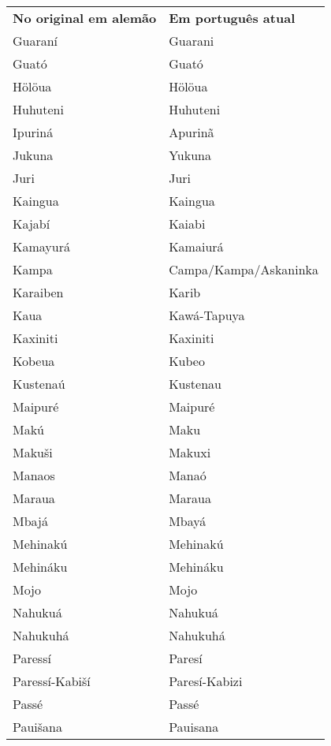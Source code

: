 \begin{table}[ht!]
\begin{center}
\begin{tabular}{ll}
\textbf{No original em alemão} & \textbf{Em português atual} \\
Guaraní & Guarani \\ 
Guató & Guató \\ 
Hölöua & Hölöua \\ 
Huhuteni & Huhuteni \\ 
Ipuriná & Apurinã \\ 
Jukuna & Yukuna \\ 
Juri & Juri \\ 
Kaingua & Kaingua \\ 
Kajabí & Kaiabi \\ 
Kamayurá & Kamaiurá \\ 
Kampa & Campa/Kampa/Askaninka \\ 
Karaiben & Karib \\ 
Kaua & Kawá-Tapuya \\ 
Kaxiniti & Kaxiniti \\ 
Kobeua & Kubeo \\ 
Kustenaú & Kustenau \\ 
Maipuré & Maipuré \\ 
Makú & Maku \\ 
Makuši & Makuxi \\ 
Manaos & Manaó \\ 
Maraua & Maraua \\ 
Mbajá & Mbayá \\ 
Mehinakú & Mehinakú \\ 
Mehináku & Mehináku \\ 
Mojo & Mojo \\ 
Nahukuá & Nahukuá \\ 
Nahukuhá & Nahukuhá \\ 
Paressí & Paresí \\ 
Paressí-Kabiší & Paresí-Kabizi \\ 
Passé & Passé \\ 
Pauišana & Pauisana \\ 
\end{tabular}
\end{center}
\end{table}

